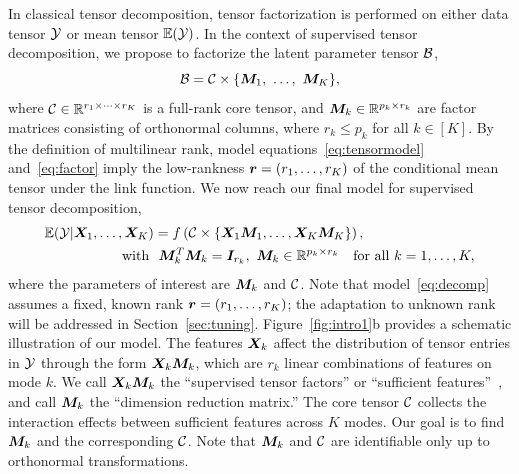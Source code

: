 \documentclass[12pt]{article}
\theoremstyle{definition}
\theoremstyle{definition}
\begin{document}
In classical tensor decomposition, tensor factorization is performed on either data tensor $\mathcal{Y}$ or mean tensor $\mathbb{E}(\mathcal{Y})$. In the context of supervised tensor decomposition, we propose to factorize the latent parameter tensor $\mathcal{B}$,
\begin{equation}\label{eq:factor}
\mathcal{B}=\mathcal{C}\times\{\bm M_1,\ \ldots,\ \bm M_K\},
\end{equation}
where $\mathcal{C}\in\mathbb{R}^{r_1\times \cdots \times r_K}$ is a full-rank core tensor, and $\bm M_k\in\mathbb{R}^{p_k\times r_k}$ are factor matrices consisting of orthonormal columns, where $r_k\leq p_k$ for all $k\in[K]$. By the definition of multilinear rank, model equations~\eqref{eq:tensormodel} and~\eqref{eq:factor} imply the low-rankness $\bm{r}=(r_1,\ldots,r_K)$ of the conditional mean tensor under the link function. We now reach our final model for supervised tensor decomposition,
\begin{align}\label{eq:decomp}
\mathbb{E}(\tY|\mX_1,\ldots,\mX_K) &= f\left(\tC\times\{\mX_1\mM_1, \ldots, \mX_K\mM_K\}\right),\notag\\
\text{with} \ &\ \mM_k^T\mM_k = \mI_{r_k},\ \mM_k\in\mathbb{R}^{p_k\times r_k}\quad \text{for all }k=1,\ldots,K,
\end{align}
where the parameters of interest are $\bm M_k$ and $\mathcal{C}$. Note that model~\eqref{eq:decomp} assumes a fixed, known rank $\bm{r}=(r_1,\ldots,r_K)$; the adaptation to unknown rank will be addressed in Section~\ref{sec:tuning}. Figure~\ref{fig:intro1}b provides a schematic illustration of our model. The features $\bm X_k$ affect the distribution of tensor entries in $\mathcal{Y}$ through the form $\bm X_k\bm M_k$, which are $r_k$ linear combinations of features on mode $k$. We call $\bm X_k\bm M_k$ the ``supervised tensor factors'' or ``sufficient features''~\citep{adragni2009sufficient}, and call $\bm M_k$ the ``dimension reduction matrix.'' The core tensor $\mathcal{C}$ collects the interaction effects between sufficient features across $K$ modes. Our goal is to find $\bm M_k$ and the corresponding $\mathcal{C}$. Note that $\bm M_k$ and $\mathcal{C}$ are identifiable only up to orthonormal transformations.  
\end{document}
